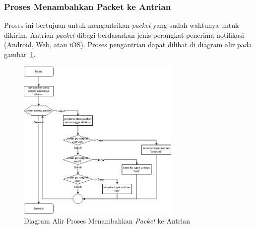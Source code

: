 \subsubsection{Proses Menambahkan Packet ke Antrian}
\par Proses ini bertujuan untuk mengantrikan \textit{packet} yang sudah waktunya untuk dikirim.
Antrian
\textit{packet} dibagi berdasarkan jenis perangkat penerima notifikasi (Android, Web, atau iOS).
Proses pengantrian
dapat dilihat di diagram alir pada gambar~\ref{flowchart_menambahkan_packet_ke_antrian}.
\begin{figure}[H]
    \centering\includegraphics[width=0.7\textwidth]{bab3/figures/flowchart_menambahkan_packet_ke_antrian.jpg}
    \caption{Diagram Alir Proses Menambahkan \textit{Packet} ke Antrian}
    \label{flowchart_menambahkan_packet_ke_antrian}
\end{figure}

